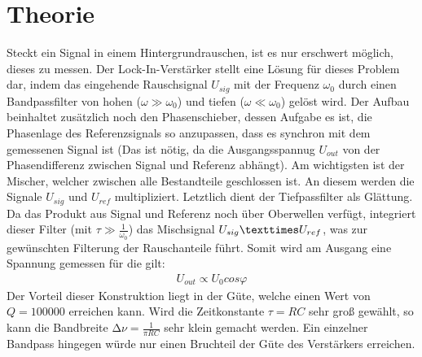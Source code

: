 \section{Theorie}
\label{sec:Theorie}

Steckt ein Signal in einem Hintergrundrauschen, ist es nur erschwert möglich, 
dieses zu messen. Der Lock-In-Verstärker stellt eine Lösung für dieses Problem 
dar, indem das eingehende Rauschsignal $U_{sig}$ mit der Frequenz $\omega_0$ 
durch einen Bandpassfilter von hohen ($\omega \gg \omega_0$) und tiefen 
($\omega \ll \omega_0$) gelöst wird. Der Aufbau beinhaltet zusätzlich noch 
den Phasenschieber, dessen Aufgabe es ist, die Phasenlage des Referenzsignals 
so anzupassen, dass es synchron mit dem gemessenen Signal ist (Das ist nötig,
da die Ausgangsspannug $U_{out}$ von der Phasendifferenz zwischen Signal und 
Referenz abhängt). Am wichtigsten ist der Mischer, welcher zwischen alle 
Bestandteile geschlossen ist. An diesem werden die Signale $U_{sig}$ und $U_{ref}$
multipliziert. Letztlich dient der Tiefpassfilter als Glättung. Da das Produkt 
aus Signal und Referenz noch über Oberwellen verfügt, integriert dieser Filter 
(mit $\tau \gg \frac{1}{\omega_0}$) das Mischsignal $U_{sig} \texttimes U_{ref}$, 
was zur gewünschten Filterung der Rauschanteile führt. Somit wird am Ausgang 
eine Spannung gemessen für die gilt:
\begin{align}
    U_{out} \propto U_0 cos \varphi
\end{align}
Der Vorteil dieser Konstruktion liegt in der Güte, welche einen Wert von 
$Q = 100000$ erreichen kann. Wird die Zeitkonstante $\tau = RC$ sehr groß 
gewählt, so kann die Bandbreite $\increment \nu = \frac{1}{\pi RC}$ sehr klein 
gemacht werden. Ein einzelner Bandpass hingegen würde nur einen Bruchteil der 
Güte des Verstärkers erreichen. 

